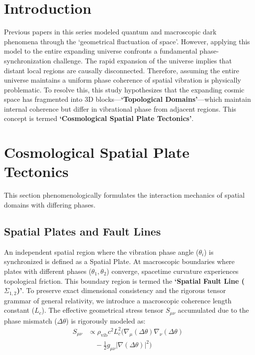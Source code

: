 \documentclass[reprint,amsmath,amssymb,aps,prd]{revtex4-2}
\begin{document}
\section{Introduction}
Previous papers in this series modeled quantum and macroscopic dark phenomena through the `geometrical fluctuation of space'.
However, applying this model to the entire expanding universe confronts a fundamental phase-synchronization challenge.
The rapid expansion of the universe \cite{Guth1981} implies that distant local regions are causally disconnected.
Therefore, assuming the entire universe maintains a uniform phase coherence of spatial vibration is physically problematic.
To resolve this, this study hypothesizes that the expanding cosmic space has fragmented into 3D blocks---\textbf{`Topological Domains'}---which maintain internal coherence but differ in vibrational phase from adjacent regions.
This concept is termed \textbf{`Cosmological Spatial Plate Tectonics'}.

\section{Cosmological Spatial Plate Tectonics}
This section phenomenologically formulates the interaction mechanics of spatial domains with differing phases.

\subsection{Spatial Plates and Fault Lines}
An independent spatial region where the vibration phase angle ($\theta_i$) is synchronized is defined as a Spatial Plate.
At macroscopic boundaries where plates with different phases ($\theta_1, \theta_2$) converge, spacetime curvature experiences topological friction.
This boundary region is termed the \textbf{`Spatial Fault Line ($\Sigma_{1,2}$)'}.
To preserve exact dimensional consistency and the rigorous tensor grammar of general relativity, we introduce a macroscopic coherence length constant ($L_c$).
The effective geometrical stress tensor $S_{\mu\nu}$ accumulated due to the phase mismatch ($\Delta\theta$) is rigorously modeled as:
\begin{equation}
\begin{split}
S_{\mu\nu} &\propto \rho_{\mathrm{vib}} c^2 L_c^2 \bigg( \nabla_\mu(\Delta\theta) \nabla_\nu(\Delta\theta) \\
&\quad - \frac{1}{2} g_{\mu\nu} |\nabla(\Delta\theta)|^2 \bigg)
\end{split}
\end{equation}
\end{document}
